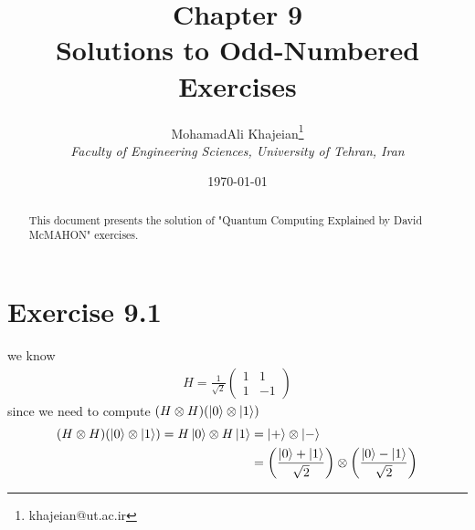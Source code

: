 \documentclass{article}
\title{\textbf{Chapter 9} \\ \small Solutions to Odd-Numbered Exercises}
\author{
    MohamadAli Khajeian\footnote{khajeian@ut.ac.ir} \\ 
    \small \textit{Faculty of Engineering Sciences, University of Tehran, Iran} \\ 
}
\date{\today}
\begin{document}
\maketitle

\begin{abstract}
    This document presents the solution of "Quantum Computing Explained by David McMAHON" exercises.
\end{abstract}

\section*{Exercise 9.1}
we know
\begin{align*}
    H = \frac{1}{\sqrt{2}}\begin{pmatrix}
        1 & 1 \\
        1 & -1
    \end{pmatrix}
\end{align*}
since we need to compute $(H \otimes H)(\ket{0}\otimes\ket{1})$
\begin{align*}
    (H \otimes H)(\ket{0}\otimes\ket{1}) = H\ket{0} \otimes H\ket{1} &= \ket{+}\otimes\ket{-} \\
    &= \bigg(\frac{\ket{0}+\ket{1}}{\sqrt{2}}\bigg) \otimes \bigg(\frac{\ket{0}-\ket{1}}{\sqrt{2}}\bigg)
\end{align*}
\end{document}
